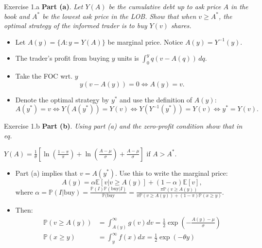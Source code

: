 \documentclass[english,10pt]{beamer}
\begin{document}
\begin{frame}{Exercise 1.a}
	\textbf{Part (a)}. \textit{Let $Y(A)$ be the cumulative debt up to ask price $A$ in the book and $A^*$ be the lowest ask price in the LOB. Show that when $v \ge A^*$, the optimal strategy of the informed trader is to buy $Y(v)$ shares.}
	\begin{itemize}
		\item Let $A(y)=\{A: y=Y(A)\}$ be marginal price. Notice $A(y)=Y^{-1}(y)$.
		\item The trader's profit from buying $y$ units is $
		\int_0^y q(v-A(q)) \, dq.$
		\item Take the FOC wrt. $y$
		\[
		y(v-A(y))=0 \Leftrightarrow A(y)=v.
		\]
		\item Denote the optimal strategy by $y^*$ and use the definition of $A(y)$:
		\[
		A(y^*)=v \Leftrightarrow Y(A(y^*))=Y(v) \Leftrightarrow Y(Y^{-1}(y^*))=Y(v) \Leftrightarrow y^*= Y(v).
		\]
	\end{itemize}
\end{frame}


\begin{frame}{Exercise 1.b}
	\textbf{Part (b)}. \textit{Using part (a) and the zero-profit condition show that in eq.}
	\begin{center}
		$
		Y(A)=\frac{1}{\theta} \left[\ln \left(\frac{1-\pi}{\pi}\right) + \ln \left(\frac{A-\mu}{\sigma}\right) + \frac{A-\mu}{\sigma}\right]\text{ if } A>A^*.
		$
	\end{center}
	\smallskip
	\smallskip
	\begin{itemize}
		\item Part (a) implies that $v=A(y^*)$. Use this to write the marginal price:
		\[
		A(y) = \alpha \mathbb{E}[v|v \ge A(y)]+(1-\alpha)\mathbb{E}[v],
		\]
		where $\alpha=\mathbb{P}(I|\text{buy})=\frac{\mathbb{P}(I)\mathbb{P}(\text{buy}|I) }{\mathbb{P}(\text{buy}}=\frac{\pi \mathbb{P}(v \ge A(y))}{\pi \mathbb{P}(v \ge A(y))+(1-\pi)\mathbb{P}(x \ge y)}$.
		\item Then:
		\begin{align*}
		\mathbb{P}(v \ge A(y)) 	&=\int_{A(y)}^\infty g(v) dv = \frac{1}{2} \exp(-\frac{A(y)-\mu}{\sigma}) \\
		\mathbb{P}(x \ge y)	&=\int_y^\infty f(x) dx = \frac{1}{2}\exp(-\theta y)
		\end{align*}
	\end{itemize}
\end{frame}
\end{document}
